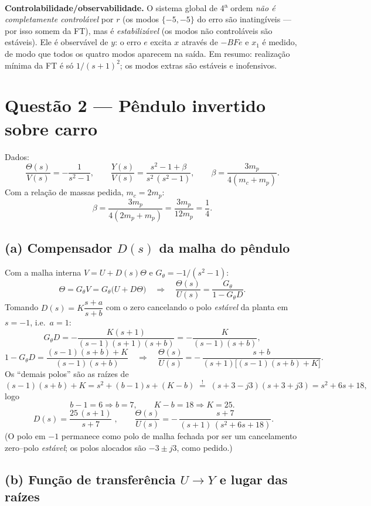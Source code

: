 \documentclass[11pt,a4paper]{article}
\begin{document}
\textbf{Controlabilidade/observabilidade.} O sistema global de 4\textsuperscript{a}
ordem \emph{n\~ao \'e completamente control\'avel} por $r$ (os modos $\{-5,-5\}$ do
erro s\~ao inating\'iveis --- por isso somem da FT), mas \'e
\emph{estabiliz\'avel} (os modos n\~ao control\'aveis s\~ao est\'aveis). Ele \'e
observ\'avel de $y$: o erro $e$ excita $x$ atrav\'es de $-BFe$ e $x_1$ \'e medido,
de modo que todos os quatro modos aparecem na sa\'ida. Em resumo: realiza\c{c}\~ao
m\'inima da FT \'e s\'o $1/(s+1)^2$; os modos extras s\~ao est\'aveis e inofensivos.

\section*{Quest\~ao 2 --- P\^endulo invertido sobre carro}

Dados:
\[
\frac{\Theta(s)}{V(s)}=-\frac{1}{s^2-1},
\qquad
\frac{Y(s)}{V(s)}=\frac{s^2-1+\beta}{s^2\,(s^2-1)},
\qquad
\beta=\frac{3m_p}{4(m_c+m_p)} .
\]
Com a rela\c{c}\~ao de massas pedida, $m_c=2m_p$:
\[
\beta=\frac{3m_p}{4(2m_p+m_p)}=\frac{3m_p}{12m_p}=\frac14 .
\]

\subsection*{(a) Compensador $D(s)$ da malha do p\^endulo}

Com a malha interna $V=U+D(s)\Theta$ e $G_\theta=-1/(s^2-1)$:
\[
\Theta=G_\theta V=G_\theta\big(U+D\Theta\big)
\quad\Longrightarrow\quad
\frac{\Theta(s)}{U(s)}=\frac{G_\theta}{1-G_\theta D}.
\]
Tomando $D(s)=K\dfrac{s+a}{s+b}$ com o zero cancelando o polo \emph{est\'avel} da
planta em $s=-1$, i.e.\ $a=1$:
\[
G_\theta D=-\frac{K(s+1)}{(s-1)(s+1)(s+b)}=-\frac{K}{(s-1)(s+b)},
\]
\[
1-G_\theta D=\frac{(s-1)(s+b)+K}{(s-1)(s+b)}
\quad\Longrightarrow\quad
\frac{\Theta(s)}{U(s)}
=-\,\frac{s+b}{(s+1)\big[(s-1)(s+b)+K\big]} .
\]
Os ``demais polos'' s\~ao as ra\'izes de
\[
(s-1)(s+b)+K=s^2+(b-1)s+(K-b)\;\overset{!}{=}\;(s+3-j3)(s+3+j3)=s^2+6s+18 ,
\]
logo
\[
b-1=6\Rightarrow b=7,
\qquad
K-b=18\Rightarrow K=25 .
\]
\[
\boxed{\;D(s)=\frac{25\,(s+1)}{s+7}\;},
\qquad
\frac{\Theta(s)}{U(s)}=-\,\frac{s+7}{(s+1)\,(s^2+6s+18)} .
\]
(O polo em $-1$ permanece como polo de malha fechada por ser um cancelamento
zero--polo \emph{est\'avel}; os polos alocados s\~ao $-3\pm j3$, como pedido.)

\subsection*{(b) Fun\c{c}\~ao de transfer\^encia $U\to Y$ e lugar das ra\'izes}
\end{document}
